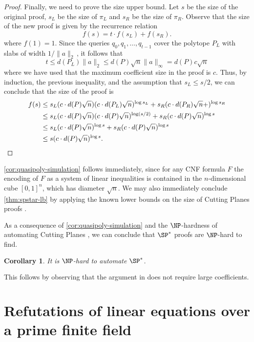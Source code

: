 \documentclass[11pt]{article}
\newtheorem{corollary}[theorem]{Corollary}
\begin{document}
\begin{proof}
	Finally, we need to prove the size upper bound. Let $s$ be the size of the original proof, $s_L$ be the size of $\pi_L$ and $s_R$ be the size of $\pi_R$. Observe that the size of the new proof is given by the recurrence relation
	\[ f(s) = t \cdot f(s_L)+f(s_R). \] 
	where $f(1) = 1$. Since the queries $q_0,q_1,\ldots, q_{t-1}$ cover the polytope $P_L$ with slabs of width $1/\|a\|_2\,$, it follows that
	\[ t \leq d(P_L) \|a\|_2 \leq d(P) \sqrt{n} \|a\|_\infty =d(P)c \sqrt{n} \]
	where we have used that the maximum coefficient size in the proof is $c$. Thus, by induction, the previous inequality, and the assumption that $s_L \leq s/2$, we can conclude that the size of the proof is
	\begin{align*}
		f(s) &\leq s_L(c \cdot d(P) \sqrt{n})(c \cdot d(P_L) \sqrt{n})^{\log s_L} + s_R(c \cdot d(P_R) \sqrt{n} +)^{\log s_R} \\
		&\leq s_L(c \cdot d(P) \sqrt{n})(c \cdot d(P) \sqrt{n})^{\log (s/2)} + s_R(c \cdot d(P) \sqrt{n} )^{\log s}\\
		&\leq s_L(c \cdot d(P) \sqrt{n})^{\log s} + s_R(c \cdot d(P) \sqrt{n})^{\log s} \\
		&\leq s(c \cdot d(P) \sqrt{n})^{\log s}. \qedhere
	\end{align*}
\end{proof}


\autoref{cor:quasipoly-simulation} follows immediately, since for any CNF formula $F$ the encoding of $F$ as a system of linear inequalities is contained in the $n$-dimensional cube $[0,1]^n$, which has diameter $\sqrt{n}$. 
We may also immediately conclude \autoref{thm:spstar-lb} by applying the known lower bounds on the size of Cutting Planes proofs \cite{Pudlak97,FlemingPPR17,HrubesP17,GargGKS18}. 

As a consequence of \autoref{cor:quasipoly-simulation} and the
%
$\NP$-hardness of automating %
Cutting Planes \cite{GoosKMP20}, we can conclude that $\SP^*$ proofs
%
%
%
%
%
are $\NP$-hard to find.   %
%

\begin{corollary}
\label{cor:non-automatability} 
%
%
It is $\NP$-hard to automate $\SP^*$.   %
%
\end{corollary}
This follows by observing that the argument in \cite{GoosKMP20} does not
require large coefficients.








\section{Refutations of linear equations over a prime finite field}\label{sec:qpSPref}
\end{document}
